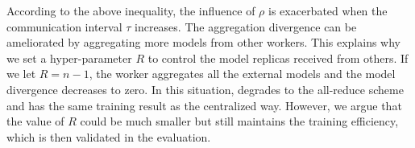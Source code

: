 According to the above inequality, the influence of $\rho$ is exacerbated when the communication interval $\tau$ increases. The aggregation divergence can be ameliorated by aggregating more models from other workers. This explains why we set a hyper-parameter $R$ to control the model replicas received from others. If we let $R=n-1$, the worker aggregates all the external models and the model divergence decreases to zero. In this situation, \sys degrades to the all-reduce scheme and has the same training result as the centralized way. However, we argue that the value of $R$ could be much smaller but still maintains the training efficiency, which is then validated in the evaluation.














